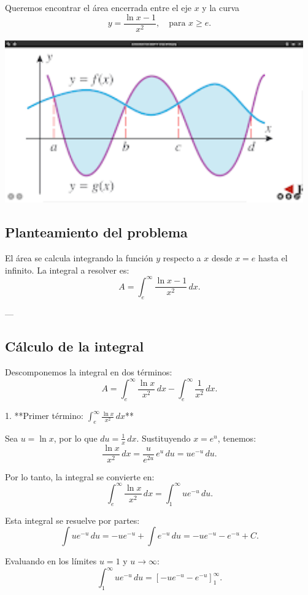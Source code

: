 \documentclass[11pt,letterpaper]{article}
\begin{document}
Queremos encontrar el área encerrada entre el eje \(x\) y la curva 
\[
y = \frac{\ln x - 1}{x^2}, \quad \text{para } x \geq e.
\]

\includegraphics[height=7cm]{./imagenes/ej51.png}

\subsection*{Planteamiento del problema}

El área se calcula integrando la función \(y\) respecto a \(x\) desde \(x = e\) hasta el infinito. La integral a resolver es:
\[
A = \int_{e}^{\infty} \frac{\ln x - 1}{x^2} \, dx.
\]

---

\subsection*{Cálculo de la integral}

Descomponemos la integral en dos términos:
\[
A = \int_{e}^{\infty} \frac{\ln x}{x^2} \, dx - \int_{e}^{\infty} \frac{1}{x^2} \, dx.
\]

1. **Primer término: \(\int_{e}^{\infty} \frac{\ln x}{x^2} \, dx\)**

Sea \(u = \ln x\), por lo que \(du = \frac{1}{x} \, dx\). Sustituyendo \(x = e^u\), tenemos:
\[
\frac{\ln x}{x^2} \, dx = \frac{u}{e^{2u}} \, e^u \, du = u e^{-u} \, du.
\]

Por lo tanto, la integral se convierte en:
\[
\int_{e}^{\infty} \frac{\ln x}{x^2} \, dx = \int_{1}^{\infty} u e^{-u} \, du.
\]

Esta integral se resuelve por partes:
\[
\int u e^{-u} \, du = -u e^{-u} + \int e^{-u} \, du = -u e^{-u} - e^{-u} + C.
\]

Evaluando en los límites \(u = 1\) y \(u \to \infty\):
\[
\int_{1}^{\infty} u e^{-u} \, du = \left[ -u e^{-u} - e^{-u} \right]_{1}^{\infty}.
\]
\end{document}
